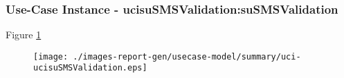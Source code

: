 
	\subsubsection{Use-Case Instance - ucisuSMSValidation:suSMSValidation}
	
	\begin{operationmodel}
	
	\end{operationmodel} 

	
	Figure \ref{fig:lu.uni.lassy.excalibur.examples.icrash-RE-UC-uci-ucisuSMSValidation}
	
	\begin{figure}[htbp]
	\begin{center}
	
	\texttt{[image: ./images-report-gen/usecase-model/summary/uci-ucisuSMSValidation.eps]}
	\end{center}
	\caption[lu.uni.lassy.excalibur.examples.icrash Sequence Diagram: uci-ucisuSMSValidation]{}
	\label{fig:lu.uni.lassy.excalibur.examples.icrash-RE-UC-uci-ucisuSMSValidation}
	\end{figure}
	\vspace{0.5cm}
